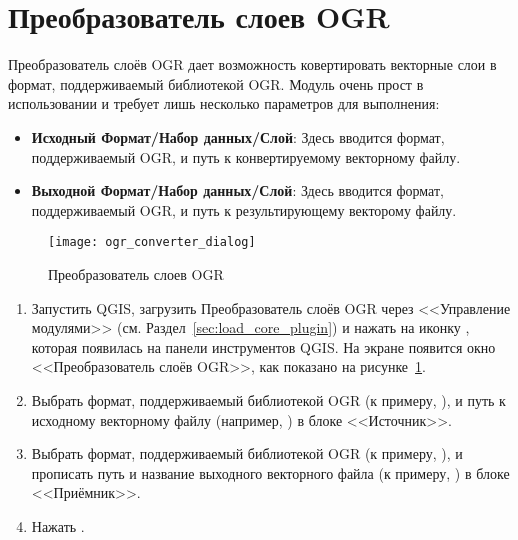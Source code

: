 
\section{Преобразователь слоев OGR}


Преобразователь слоёв OGR дает возможность ковертировать векторные слои
в формат, поддерживаемый библиотекой OGR.  Модуль очень прост в использовании и требует лишь несколько
параметров для выполнения:

\begin{itemize}[label=--]
\item \textbf{Исходный Формат/Набор данных/Слой}: Здесь вводится
формат, поддерживаемый OGR, и путь к конвертируемому векторному файлу.
\item \textbf{Выходной Формат/Набор данных/Слой}: Здесь вводится
формат, поддерживаемый OGR, и путь к результирующему векторому файлу.
\end{itemize}

\begin{figure}[ht]
 \centering
   \texttt{[image: ogr\_converter\_dialog]}
   \caption{Преобразователь слоев OGR \wincaption}\label{fig:ogr_converter_dialog}
\end{figure}


\begin{enumerate}
  \item Запустить QGIS, загрузить Преобразователь слоёв OGR через
  <<Управление модулями>> (см. Раздел~\ref{sec:load_core_plugin}) и
  нажать на иконку ,
  которая появилась на панели инструментов QGIS. На экране появится окно
  <<Преобразователь слоёв OGR>>, как показано на рисунке~\ref{fig:ogr_converter_dialog}.
  \item Выбрать формат, поддерживаемый библиотекой OGR (к примеру,
  ), и путь к исходному
  векторному файлу (например, ) в блоке <<Источник>>.
  \item Выбрать формат, поддерживаемый библиотекой OGR (к примеру,
  ), и прописать путь и название выходного
  векторного файла (к примеру, ) в блоке <<Приёмник>>.
  \item Нажать .
\end{enumerate}

\FloatBarrier
